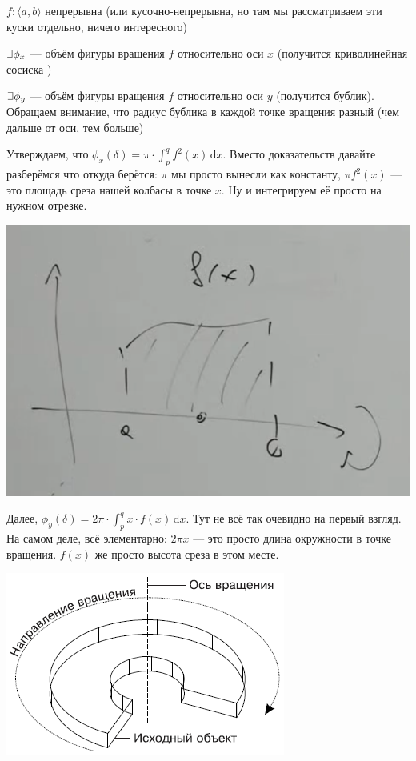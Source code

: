 \documentclass{article}
\def\letus{%
\mathord{\setbox0=\hbox{$\exists$}%
         \hbox{\kern 0.125\wd0%
               \vbox to \ht0{%
                  \hrule width 0.75\wd0%
                  \vfill%
                  \hrule width 0.75\wd0}%
               \vrule height \ht0%
               \kern 0.125\wd0}%
       }%
        }
\def\D{\,\mathrm{d}}
\begin{document}
$f: \langle a, b \rangle$ непрерывна (или кусочно-непрерывна, но там мы рассматриваем эти куски отдельно, ничего интересного)

$\letus \phi_x$ --- объём фигуры вращения $f$ относительно оси $x$ (получится криволинейная сосиска \Smiley)

$\letus \phi_y$ --- объём фигуры вращения $f$ относительно оси $y$ (получится бублик). Обращаем внимание, что радиус бублика в каждой точке вращения разный (чем дальше от оси, тем больше)

Утверждаем, что $\phi_x(\delta) = \pi \cdot \int_p^q f^2(x) \D x$. Вместо доказательств давайте разберёмся что откуда берётся: $\pi$ мы просто вынесли как константу, $\pi f^2(x)$ --- это площадь среза нашей колбасы в точке $x$. Ну и интегрируем её просто на нужном отрезке.

\includegraphics[]{rotate_x.png}

Далее, $\phi_y(\delta) = 2\pi \cdot \int_p^q x \cdot f(x) \D x$. Тут не всё так очевидно на первый взгляд. На самом деле, всё элементарно: $2\pi x$ --- это просто длина окружности в точке вращения. $f(x)$ же просто высота среза в этом месте. 

\includegraphics[]{rotate_y.png}
\end{document}
